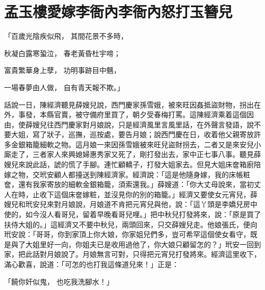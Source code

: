 %

\chapter{孟玉樓愛嫁李衙內\KG 李衙內怒打玉簪兒}


\begin{showcontents}{}



「百歲光陰疾似飛，  其間花景不多時，

秋凝白露寒蛩泣，  春老黃昏杜宇啼；

富貴繁華身上孽，  功明事跡目中魑，

一場春夢由人做，  自有青天報不欺。」

話說一日，陳經濟聽見薛嫂兒說，西門慶家孫雪娥，被來旺因姦抵盜財物，拐出在外，事發，本縣官賣，被守備府里買了，朝夕受春梅打罵。這陳經濟乘着這個因由，使薛嫂兒往西門慶家對月娘說，只是經濟風里言風里話，在外聲言發語，說不要大姐，寫了狀子，巡撫，巡按處，要告月娘；說西門慶在日，收着他父親寄放許多金銀箱籠細軟之物。這月娘一來因孫雪娥被來旺兒盜財拐去，二者又是來安兒小廝走了，三者家人來興媳婦惠秀家又死了，剛打發出去，家中正七事八事。聽見薛嫂兒來說此話，諕的慌了手腳。連忙顧轎子，打發大姐家去。但見大姐床奩箱廚陪嫁之物，交玳安顧人都擡送到陳經濟家。經濟說：「這是他隨身嫁，我的床帳粧奩，還有我家寄放的細軟金銀箱籠，須索還我。」薛嫂道：「你大丈母說來，當初丈人在時，止收下這個床奩嫁粧，並沒見你的別的箱籠。」經濟又要使女元宵兒，薛嫂兒和玳安兒來對月娘說，月娘道不肯把元宵兒與他，說：「這丫頭是李嬌兒房中使的，如今沒人看哥兒，留着早晚看哥兒哩。」把中秋兒打發將來，說：「原是買了扶侍大姐的。」這經濟又不要中秋兒，兩頭回來，只交薛嫂兒走。他娘張氏，便向玳安說：「哥哥，你到家頂上你大娘，你家姐兒們多，豈可希罕這個使女看守，既是與了大姐里好一向，你姐夫已是收用過他了，你大娘只顧留怎的？」玳安一回到家，把此話對月娘說了。月娘無言可對，只得把元宵兒打發將來。經濟這里收下，滿心歡喜，說道：「可怎的也打我這條道兒來！」正是：

「饒你奸似鬼，  也吃我洗腳水！」


\end{showcontents}
